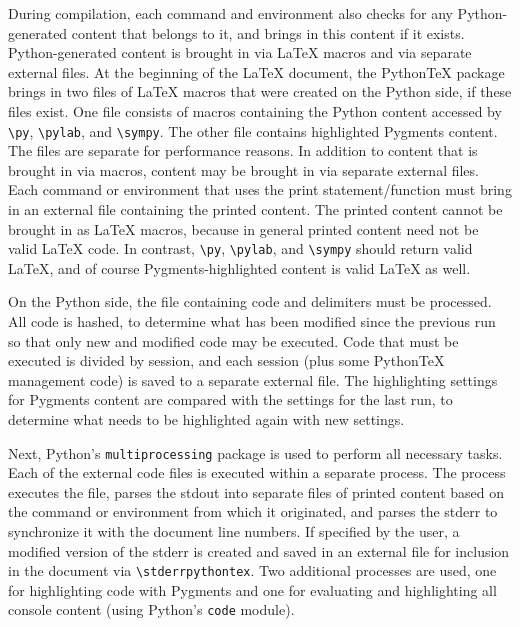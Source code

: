 \documentclass[letterpaper,compsoc,twoside]{IEEEtran}
\begin{document}
During compilation, each command and environment also checks for any Python-generated content that belongs to it, and brings in this content
if it exists.  Python-generated content is brought in via LaTeX macros
and via separate external files.  At the beginning of the LaTeX document,
the PythonTeX package brings in two files of LaTeX macros that were
created on the Python side, if these files exist.  One file consists
of macros containing the Python content accessed by \texttt{\textbackslash{}py}, \texttt{\textbackslash{}pylab},
and \texttt{\textbackslash{}sympy}.  The other file contains highlighted Pygments content.
The files are separate for performance reasons.  In addition to content
that is brought in via macros, content may be brought in via separate
external files.  Each command or environment that uses the print
statement/function must bring in an external file containing the
printed content.  The printed content cannot be brought in as LaTeX
macros, because in general printed content need not be valid LaTeX
code.  In contrast, \texttt{\textbackslash{}py}, \texttt{\textbackslash{}pylab}, and \texttt{\textbackslash{}sympy} should return valid
LaTeX, and of course Pygments-highlighted content is valid LaTeX
as well.

On the Python side, the file containing code and delimiters must be
processed.  All code is hashed, to determine what has been modified
since the previous run so that only new and modified code may be
executed.  Code that must be executed is divided by session, and each
session (plus some PythonTeX management code) is saved to a separate
external file.  The highlighting settings for Pygments content are
compared with the settings for the last run, to determine what needs
to be highlighted again with new settings.

Next, Python's \texttt{multiprocessing} package is used to perform all
necessary tasks.  Each of the external code files is executed within
a separate process.  The process executes the file, parses the stdout
into separate files of printed content based on the command or
environment from which it originated, and parses the stderr to
synchronize it with the document line numbers.  If specified by the
user, a modified version of the stderr is created and saved in an
external file for inclusion in the document via \texttt{\textbackslash{}stderrpythontex}.
Two additional processes are used, one for highlighting code with
Pygments and one for evaluating and highlighting all console content
(using Python's \texttt{code} module).
\end{document}
